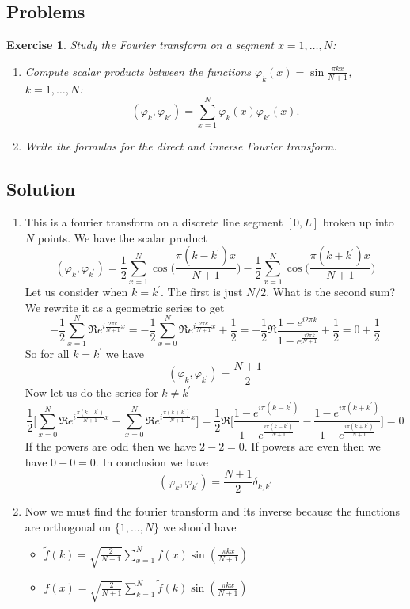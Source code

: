 \documentclass[11pt,a4paper]{article}
\newtheorem*{exercise}{Exercise}
\newcommand{\solution}[1]{
	\subsection*{Solution}
	#1
}
\newcommand{\problems}[1]{
	\subsection*{Problems}
	#1
}
\begin{document}
\problems{
\begin{exercise}
	Study the Fourier transform on a segment $x = 1, \dots, N$:
	\begin{enumerate}
		\item Compute scalar products between the functions $\varphi_k(x) = \sin\frac{\pi kx}{N+1}$, $k = 1, \dots, N$:
		\[
		(\varphi_k, \varphi_{k'}) = \sum_{x=1}^{N} \varphi_k(x)\varphi_{k'}(x).
		\]
		\item Write the formulas for the direct and inverse Fourier transform.
	\end{enumerate}
\end{exercise}
\solution{
	\begin{enumerate}
		\item This is a fourier transform on a discrete line segment $[0,L]$ broken up into $N$ points. 
We have the scalar product
$$
(\varphi_{k},\varphi_{k^{\prime}}) = \frac{1}{2}\sum_{x=1}^{N}\cos{\big(\frac{\pi(k-k^{\prime})x}{N+1}\big)}- \frac{1}{2}\sum_{x=1}^{N}\cos{\big(\frac{\pi(k+k^{\prime})x}{N+1}\big)}
$$
Let us consider when $k=k^{\prime}$. The first is just $N/2$. What is the second sum? We rewrite it as a geometric series  to get
$$
-\frac{1}{2}\sum_{x=1}^{N}\Re{e^{i\frac{2\pi k}{N+1}x}} = -\frac{1}{2}\sum_{x=0}^{N}\Re{e^{i\frac{2\pi k}{N+1}x}}+\frac{1}{2} = -\frac{1}{2}\Re{\frac{1-e^{i2\pi k}}{1-e^{\frac{i2\pi k}{N+1}}}}+\frac{1}{2} = 0 +\frac{1}{2}
$$
So for all $k = k^{\prime}$ we have
$$
(\varphi_{k},\varphi_{k^{\prime}}) = \frac{N+1}{2}$$
Now let us do the series for $k\neq k^{\prime}$
$$
\frac{1}{2}\big[\sum_{x=0}^{N}\Re{e^{i\frac{\pi (k-k^{\prime})}{N+1}x}}- \sum_{x=0}^{N}\Re{e^{i\frac{\pi (k+k^{\prime})}{N+1}x}}\big] = \frac{1}{2}\Re{\bigg[\frac{1-e^{i\pi(k-k^{\prime})}}{1-e^{\frac{i\pi (k-k^{\prime})}{N+1}}}-\frac{1-e^{i\pi(k+k^{\prime})}}{1-e^{\frac{i\pi (k+k^{\prime})}{N+1}}}\bigg]} = 0
$$
If the powers are odd then we have $2-2 = 0$. If powers are even then we have $0-0 = 0$. In conclusion we have
$$
(\varphi_{k},\varphi_{k^{\prime}}) = \frac{N+1}{2}\delta_{k,k^{\prime}}
$$
\item Now we must find the fourier transform and its inverse because the functions are orthogonal on $\{1,...,N\}$ we should have
\begin{itemize}
\item $\tilde{f}(k) = \sqrt{\frac{2}{N+1}}\sum_{x=1}^{N}f(x)\sin{(\frac{\pi k x}{N+1})}$
\item $f(x) = \sqrt{\frac{2}{N+1}}\sum_{k=1}^{N}\tilde{f}(k)\sin{(\frac{\pi k x}{N+1})}$
\end{itemize}
\end{enumerate}
}

}
\end{document}
